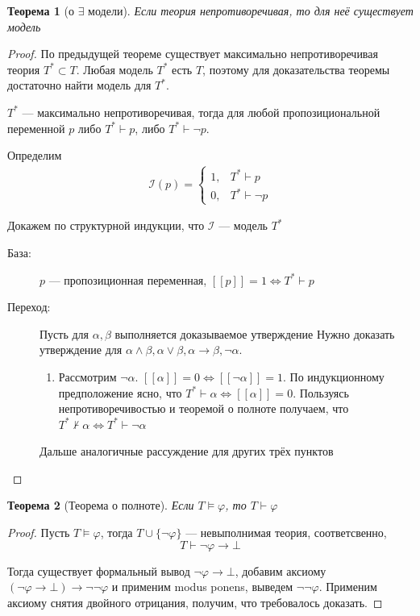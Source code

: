 \documentclass[12pt]{article}
\newtheorem{theorem}{Теорема}
\begin{document}
\begin{theorem}[о $\exists$ модели]
	Если теория непротиворечивая, то для неё существует модель
\end{theorem}
\begin{proof}
	По предыдущей теореме существует максимально непротиворечивая теория $T^* \subset T$. Любая модель $T^*$ есть $T$, поэтому для доказательства теоремы достаточно найти модель для $T^*$.

	$T^*$ --- максимально непротиворечивая, тогда для любой пропозициональной переменной $p$ либо $T^* \vdash p$, либо $T^* \vdash \lnot p$.

	Определим
	\begin{align}
		\mathcal{I}(p) = \begin{cases}
			                 1, & T^* \vdash p       \\
			                 0, & T^* \vdash \lnot p
		                 \end{cases}
	\end{align}


	Докажем по структурной индукции, что $\mathcal{I}$ --- модель $T^*$

	\begin{description}
		\item[$\text{База}:$]
		      $p$ --- пропозиционная переменная,
		      $[\![ p ]\!] = 1 \iff T^* \vdash p$
		\item[$\text{Переход}:$]
		      Пусть для $\alpha, \beta$ выполняется доказываемое утверждение
		      Нужно доказать утверждение для $\alpha \land \beta, \alpha \lor \beta, \alpha \to \beta, \lnot \alpha$.
		      \begin{enumerate}
			      \item Рассмотрим $\lnot \alpha$. $[\![ \alpha ]\!] = 0 \iff [\![ \lnot \alpha ]\!] = 1$. По индукционному предположение ясно, что $T^* \vdash \alpha \iff [\![ \alpha ]\!] = 0$. Пользуясь непротиворечивостью и теоремой о полноте получаем, что $T^* \nvdash \alpha \iff T^* \vdash \lnot \alpha$
		      \end{enumerate}
		      Дальше аналогичные рассуждение для других трёх пунктов

	\end{description}
\end{proof}
\begin{theorem}[Теорема о полноте]
	Если $T \models \varphi$, то $T \vdash \varphi$
\end{theorem}
\begin{proof}
	Пусть $T \models \varphi$, тогда $T \cup \{\lnot \varphi\}$ --- невыполнимая теория, соответсвенно,
	\[T \vdash \lnot \varphi \to \bot\]

	Тогда существует формальный вывод $\lnot \varphi \to \bot$,
	добавим аксиому $(\lnot \varphi \to \bot) \to \lnot \lnot \varphi$
	и применим modus ponens, выведем $\lnot \lnot \varphi$. Применим аксиому снятия двойного отрицания, получим, что требовалось доказать.

\end{proof}
\end{document}
